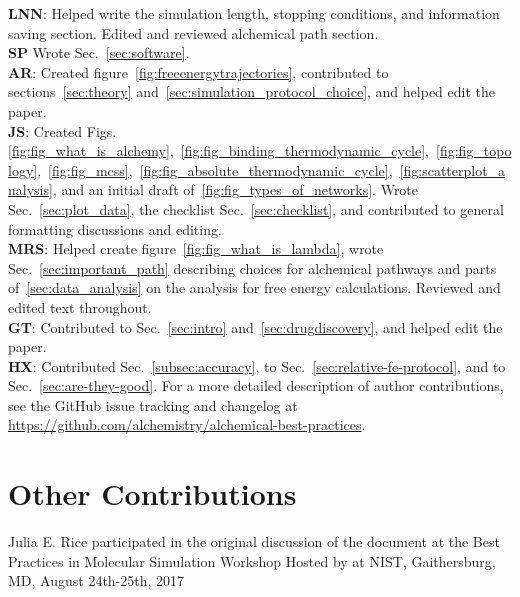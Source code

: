 \documentclass[9pt,bestpractices]{livecoms}
\newcommand{\githubrepository}{\url{https://github.com/alchemistry/alchemical-best-practices}} %
\begin{document}
\textbf{LNN}: Helped write the simulation length, stopping conditions, and information saving section. Edited and reviewed alchemical path section.\\
\textbf{SP} Wrote Sec.~\ref{sec:software}. \\
\textbf{AR}: Created figure~\ref{fig:freeenergytrajectories}, contributed to sections~\ref{sec:theory} and~\ref{sec:simulation_protocol_choice}, and helped edit the paper.\\
\textbf{JS}: Created Figs.~ \ref{fig:fig_what_is_alchemy},~\ref{fig:fig_binding_thermodynamic_cycle},~\ref{fig:fig_topology},~\ref{fig:fig_mcss},~\ref{fig:fig_absolute_thermodynamic_cycle},~\ref{fig:scatterplot_analysis}, and an initial draft of~\ref{fig:fig_types_of_networks}. Wrote Sec.~\ref{sec:plot_data}, the checklist Sec.~\ref{sec:checklist}, and contributed to general formatting discussions and editing.\\
\textbf{MRS}: Helped create figure~\ref{fig:fig_what_is_lambda}, wrote Sec.~\ref{sec:important_path} describing choices for alchemical pathways and parts of~\ref{sec:data_analysis} on the analysis for free energy calculations. Reviewed and edited text throughout.\\
\textbf{GT}: Contributed to Sec.~\ref{sec:intro} and~\ref{sec:drugdiscovery}, and helped edit the paper.\\
\textbf{HX}: Contributed Sec.~\ref{subsec:accuracy}, to Sec.~\ref{sec:relative-fe-protocol}, and to Sec.~\ref{sec:are-they-good}.
For a more detailed description of author contributions,
see the GitHub issue tracking and changelog at \githubrepository.

\section*{Other Contributions}
%
Julia E. Rice participated in the original discussion of the document at the Best Practices in Molecular Simulation Workshop Hosted by at NIST, Gaithersburg, MD, August 24th-25th, 2017
\end{document}
